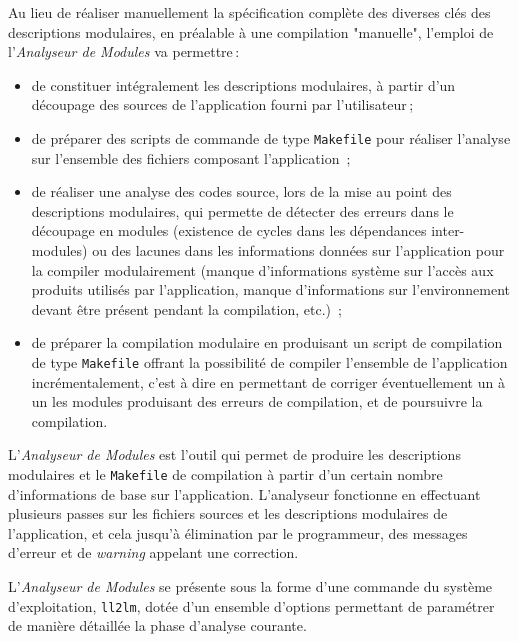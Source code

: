Au lieu de r\'{e}aliser manuellement 
la sp\'{e}cification compl\`{e}te des diverses cl\'{e}s des 
descriptions modulaires, en pr\'{e}alable
\`{a} une compilation "manuelle", 
l'emploi de l'{\em Analyseur de Modules} va permettre\,:
\begin{itemize}
\item de constituer int\'{e}gralement les descriptions modulaires, \`{a}
partir d'un d\'{e}coupage des sources de l'application fourni par
l'utilisateur\,;
\item de pr\'{e}parer des scripts de commande de type {\tt Makefile}
pour r\'{e}aliser l'analyse sur l'ensemble des fichiers composant
l'application \,;
\item de r\'{e}aliser une analyse des codes source, lors
de la mise au point des descriptions modulaires, qui permette
de d\'{e}tecter des erreurs dans le d\'{e}coupage en modules (existence
de cycles dans les d\'{e}pendances inter-modules)
ou des lacunes dans les informations donn\'{e}es sur l'application
pour la compiler modulairement 
(manque d'informations syst\`{e}me sur l'acc\`{e}s
aux produits utilis\'{e}s par l'application, manque d'informations
sur l'environnement devant \^{e}tre pr\'{e}sent pendant la compilation,
etc.) \,;
\item de pr\'{e}parer la compilation modulaire en produisant un
script de compilation de type {\tt Makefile}
offrant la possibilit\'{e} de compiler l'ensemble de l'application
incr\'{e}mentalement, c'est \`{a} dire en permettant de
corriger \'{e}ventuellement un \`{a} un les
modules produisant des erreurs de compilation, et de poursuivre
la compilation.
\end{itemize}



L'{\em Analyseur de Modules} est l'outil
qui permet de produire les
descriptions modulaires et le {\tt Makefile} de compilation \`{a} partir
d'un certain nombre d'informations de base sur l'application.
L'analyseur fonctionne en effectuant plusieurs passes sur les fichiers
sources et les descriptions modulaires de l'application,
et cela jusqu'\`{a} \'{e}limination par
le programmeur, des messages d'erreur et de {\em warning} appelant une
correction.



L'{\em Analyseur de Modules} se pr\'{e}sente sous la forme d'une commande
du syst\`{e}me d'exploitation, {\tt ll2lm}, 
dot\'{e}e d'un ensemble d'options
permettant de param\'{e}trer de mani\`{e}re d\'{e}taill\'{e}e
la phase d'analyse courante.

